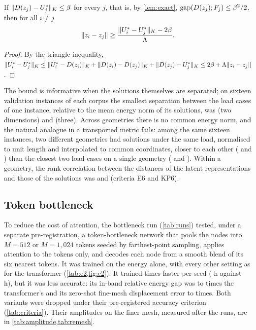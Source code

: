 \begin{proposition}\label{prop:sep}
If $\lVert D(z_j)-U^{\ast}_j\rVert_K\le\beta$ for every $j$, that is, by \cref{lem:exact},
$\operatorname{gap}(D(z_j);F_j)\le\beta^2/2$, then for all $i\neq j$
\begin{equation}
\lVert z_i-z_j\rVert \ge \frac{\lVert U^{\ast}_i-U^{\ast}_j\rVert_K-2\beta}{\Lambda}.
\label{eq:sep}
\end{equation}
\end{proposition}

\begin{proof}
By the triangle inequality,
$\lVert U^{\ast}_i-U^{\ast}_j\rVert_K\le\lVert U^{\ast}_i-D(z_i)\rVert_K+\lVert D(z_i)-D(z_j)\rVert_K
+\lVert D(z_j)-U^{\ast}_j\rVert_K\le2\beta+\Lambda\lVert z_i-z_j\rVert$.
\end{proof}

The bound is informative when the solutions themselves are separated; on sixteen
validation instances of each corpus the smallest separation between the load cases of one
instance, relative to the mean energy norm of its solutions, was \numPremiseTwo{} (two
dimensions) and \numPremiseThree{} (three). Across geometries there is no common energy
norm, and the natural analogue in a transported metric fails: among the same sixteen
instances, two different geometries had solutions under the same load, normalised to unit
length and interpolated to common coordinates, closer to each other (\numCrossTwo{} and
\numCrossThree{}) than the closest two load cases on a single geometry (\numWithinTwo{} and
\numWithinThree{}). Within a geometry, the rank correlation between the distances of the
latent representations and those of the solutions was \numRhoTwo{} and \numRhoThree{}
(criteria E6 and KP6).



\subsection{Token bottleneck}\label{app:e1:bottleneck}

To reduce the cost of attention, the bottleneck run (\cref{tab:runs}) tested, under a
separate pre-registration, a token-bottleneck network that pools the nodes into $M=512$ or
$M=1{,}024$ tokens seeded by farthest-point sampling, applies attention to the tokens only,
and decodes each node from a smooth blend of its six nearest tokens. It was trained on the
energy alone, with every other setting as for the transformer (\cref{tab:e2,fig:e2}). It
trained \numTimeBottleneckSpeedup{} times faster per seed (\numTimeBottleneckSeedMin{} h
against \numTimeThreeSeed{} h), but it was less accurate: its in-band relative energy gap
was \numEtwoGapMin{} to \numEtwoGapMax{} times the transformer's and its zero-shot
fine-mesh displacement error \numEtwoFineMin{} to \numEtwoFineMax{} times. Both variants
were dropped under their pre-registered accuracy criterion (\cref{tab:criteria}). Their
amplitudes on the finer mesh, measured after the runs, are in
\cref{tab:amplitude,tab:remesh}.

